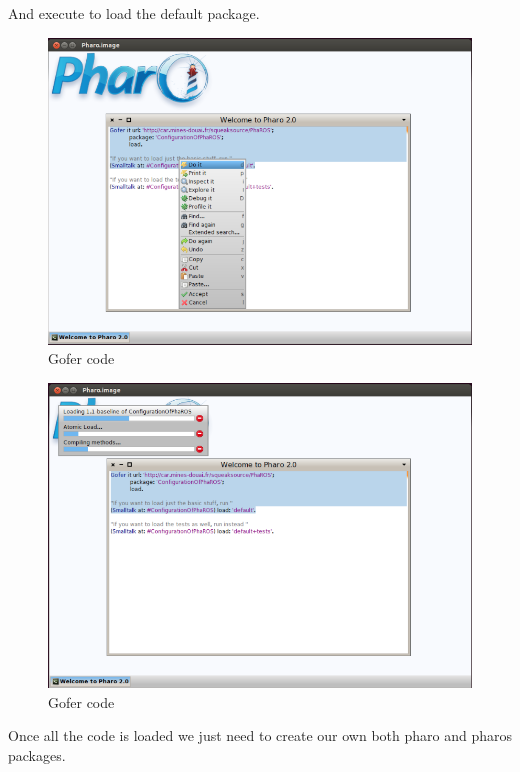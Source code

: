 \documentclass[a4paper,10pt,twoside]{book}
\begin{document}
						
						
						
						And execute to load the default package. 
						
						\begin{figure}[!htbp]
			  				\centering
    								\includegraphics[width=1\textwidth]{GoferCodeDoIT.png}
								\caption{Gofer code}
							\centering
						\end{figure}
						
						\begin{figure}[!htbp]
			  				\centering
    								\includegraphics[width=1\textwidth]{GoferCodeLoading.png}
								\caption{Gofer code}
							\centering
						\end{figure}
						
						
						Once all the code is loaded we just need to create our own both pharo and pharos packages. 
						
\end{document}
